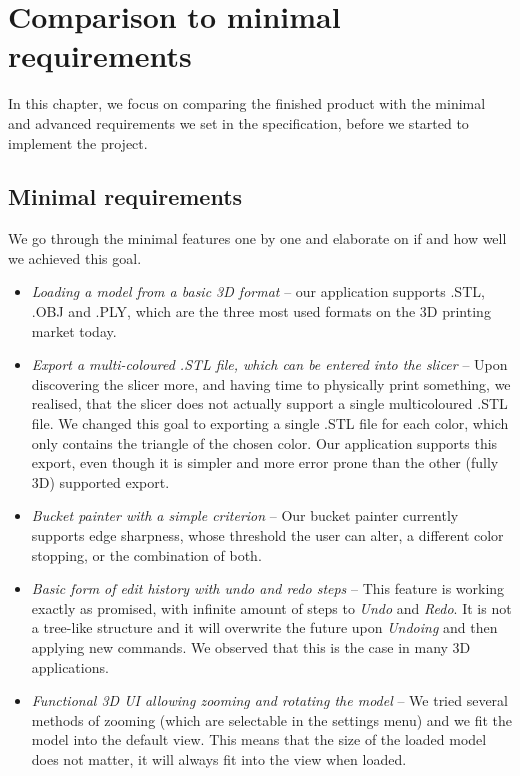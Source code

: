\chapter{Comparison to minimal requirements}
\label{ch:min-req}

In this chapter, we focus on comparing the finished product with the minimal and advanced requirements we set in the specification, before we started to implement the project.

\section{Minimal requirements}

We go through the minimal features one by one and elaborate on if and how well we achieved this goal.

\begin{itemize}
\item \textit{Loading a model from a basic 3D format} -- our application supports .STL, .OBJ and .PLY, which are the three most used formats on the 3D printing market today.

\item \textit{Export a multi-coloured .STL file, which can be entered into the slicer} -- Upon discovering the slicer more, and having time to physically print something, we realised, that the slicer does not actually support a single multicoloured .STL file. We changed this goal to exporting a single .STL file for each color, which only contains the triangle of the chosen color. Our application supports this export, even though it is simpler and more error prone than the other (fully 3D) supported export.

\item \textit{Bucket painter with a simple criterion} -- Our bucket painter currently supports edge sharpness, whose threshold the user can alter, a different color stopping, or the combination of both.

\item \textit{Basic form of edit history with undo and redo steps} -- This feature is working exactly as promised, with infinite amount of steps to \textit{Undo} and \textit{Redo}. It is not a tree-like structure and it will overwrite the future upon \textit{Undoing} and then applying new commands. We observed that this is the case in many 3D applications.

\item \textit{Functional 3D UI allowing zooming and rotating the model} -- We tried several methods of zooming (which are selectable in the settings menu) and we fit the model into the default view. This means that the size of the loaded model does not matter, it will always fit into the view when loaded.
\end{itemize}

